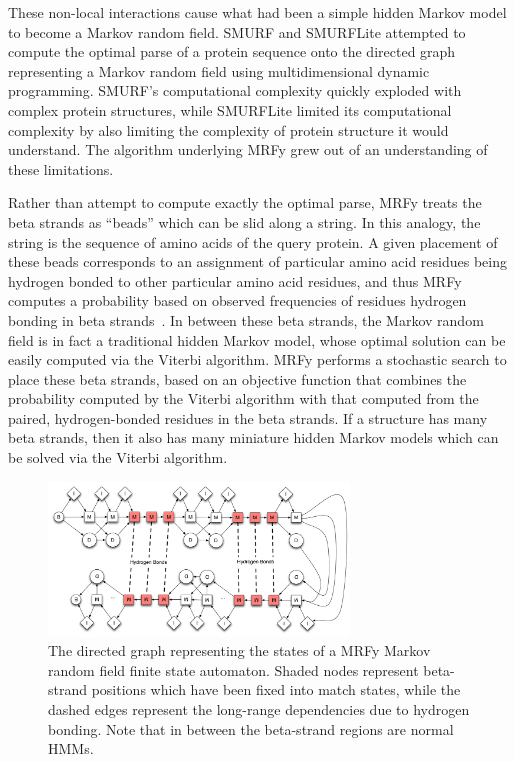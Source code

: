 \documentclass[preprint]{sigplanconf}
\begin{document}
These non-local interactions cause what had been a simple hidden Markov model 
to become a Markov random field. SMURF and SMURFLite attempted to compute the 
optimal parse of a protein sequence onto the directed graph representing a 
Markov random field using multidimensional dynamic programming. SMURF's 
computational complexity quickly exploded with complex protein structures, 
while SMURFLite limited its computational complexity by also limiting the 
complexity of protein structure it would understand. The algorithm underlying 
MRFy grew out of an understanding of these limitations.


Rather than attempt to compute exactly the optimal parse, MRFy treats the beta 
strands as ``beads'' which can be slid along a string. In this analogy, the 
string is the sequence of amino acids of the query protein. A given placement 
of these beads corresponds to an assignment of particular amino acid residues 
being hydrogen bonded to other particular amino acid residues, and thus MRFy 
computes a probability based on observed frequencies of residues hydrogen 
bonding in beta strands~\cite{betawrappro}. In between these beta strands, the 
Markov random field is in fact a traditional hidden Markov model, whose optimal 
solution can be easily computed via the Viterbi algorithm. MRFy performs a 
stochastic search to place these beta strands, based on an objective function 
that combines the probability computed by the Viterbi algorithm with that 
computed from the paired, hydrogen-bonded residues in the beta strands. If a 
structure has many beta strands, then it also has many miniature hidden Markov 
models which can be solved via the Viterbi algorithm.


\begin{figure}[h!] 
\centerline{\includegraphics[width=8cm]{mrf_interleave_diagram.pdf}} 
\caption{The directed graph representing the states of a MRFy Markov random 
field finite state automaton. Shaded nodes represent beta-strand positions which have been fixed into match states, 
while the dashed edges represent the long-range dependencies due to hydrogen 
bonding. Note that in between the beta-strand regions are normal HMMs.}\label{mrf} \end{figure}
\end{document}
